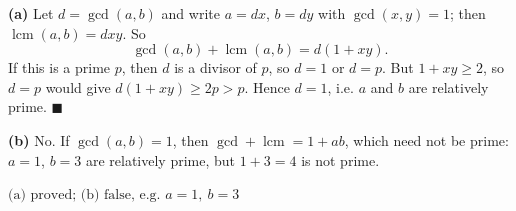 \textbf{(a)} Let $d=\gcd(a,b)$ and write $a=dx$, $b=dy$ with $\gcd(x,y)=1$; then $\operatorname{lcm}(a,b)=dxy$. So
\[\gcd(a,b)+\operatorname{lcm}(a,b)=d(1+xy).\]
If this is a prime $p$, then $d$ is a divisor of $p$, so $d=1$ or $d=p$. But $1+xy\ge2$, so $d=p$ would give $d(1+xy)\ge2p>p$. Hence $d=1$, i.e. $a$ and $b$ are relatively prime. $\blacksquare$

\textbf{(b)} No. If $\gcd(a,b)=1$, then $\gcd+\operatorname{lcm}=1+ab$, which need not be prime: $a=1$, $b=3$ are relatively prime, but $1+3=4$ is not prime.

$\boxed{\text{(a) proved; (b) false, e.g. }a=1,\ b=3}$

